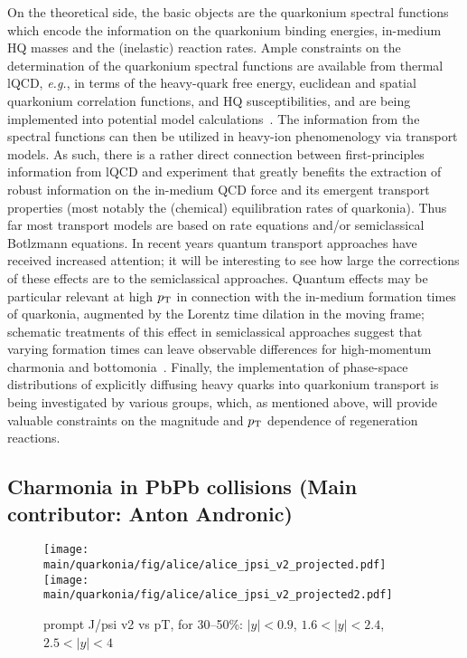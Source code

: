 \documentclass[../report.tex]{subfiles}
\providecommand{\main}{..}
\begin{document}
On the theoretical side, the basic objects are the quarkonium spectral functions which 
encode the information on the quarkonium binding energies, in-medium HQ masses and the
(inelastic) reaction rates. Ample constraints on the determination of the quarkonium
spectral functions are available from thermal lQCD, {\it e.g.}, in terms of the heavy-quark
free energy, euclidean and spatial quarkonium correlation functions, and HQ susceptibilities,
and are being implemented into potential model 
calculations~\cite{Wong:2004zr,Mocsy:2005qw,Alberico:2006vw,Brambilla:2008cx,Riek:2010py,Burnier:2015tda,Liu:2017qah}.
The information from the spectral functions can then be utilized in heavy-ion phenomenology
via transport models. As such, there is a rather direct connection between first-principles
information from lQCD and experiment that greatly benefits the extraction of robust information 
on the in-medium QCD force and its emergent transport properties (most notably the (chemical)
equilibration rates of quarkonia). 
Thus far most transport models are based on rate equations and/or
semiclassical Botlzmann equations. In recent years quantum transport approaches have 
received increased attention; it will be interesting to see how large the corrections
of these effects are to the semiclassical approaches. Quantum effects may be particular 
relevant at high $p_{\rm T}$ in connection with the in-medium formation times of quarkonia, 
augmented by the Lorentz time dilation in the moving frame; schematic treatments of
this effect in semiclassical approaches suggest that varying formation times can leave 
observable differences for high-momentum charmonia and 
bottomonia~\cite{Song:2015bja,Hoelck:2016tqf,Du:2017qkv,Aronson:2017ymv,Krouppa:2017jlg}. 
Finally, the implementation of phase-space distributions of explicitly diffusing heavy quarks 
into quarkonium transport is being investigated by various groups, which, as mentioned above, 
will provide valuable constraints on the magnitude and $p_{\rm T}$ dependence of regeneration 
reactions.   

\subsection{Charmonia in PbPb collisions (Main contributor: Anton Andronic)}


\begin{figure}

\begin{center}
 \texttt{[image: \\main/quarkonia/fig/alice/alice\_jpsi\_v2\_projected.pdf]}
 \texttt{[image: \\main/quarkonia/fig/alice/alice\_jpsi\_v2\_projected2.pdf]}
\end{center}

 \caption{prompt J/psi v2 vs pT, for 30--50\%: $|y|<0.9$, $1.6<|y|<2.4$, $2.5<|y|<4$~\cite{Abelev:1475243,CERN-LHCC-2013-014}}
\end{figure}
\end{document}
